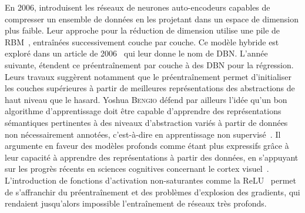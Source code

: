 En 2006, \citet{hinton_reducing_2006} introduisent les réseaux de neurones auto-encodeurs capables de compresser un ensemble de données en les projetant dans un espace de dimension plus faible. Leur approche pour la réduction de dimension utilise une pile de \gls{RBM}~\cite{ackley_learning_1985,salakhutdinov_deep_2009}, entraînées successivement couche par couche. Ce modèle hybride est exploré dans un article de 2006~\cite{hinton_fast_2006} qui leur donne le nom de \gls{DBN}. L'année suivante, \citet{bengio_greedy_2007} étendent ce préentraînement par couche à des \gls{DBN} pour la régression. Leurs travaux suggèrent notamment que le préentraînement permet d'initialiser les couches supérieures à partir de meilleures représentations des abstractions de haut niveau que le hasard. Yoshua \textsc{Bengio} défend par ailleurs l'idée qu'un bon algorithme d'apprentissage doit être capable d'apprendre des représentations sémantiques pertinentes à des niveaux d'abstraction variés à partir de données non nécessairement annotées, c'est-à-dire en apprentissage non supervisé~\cite{bengio_learning_2009}. Il argumente en faveur des modèles profonds comme étant plus expressifs grâce à leur capacité à apprendre des représentations à partir des données, en s'appuyant sur les progrès récents en sciences cognitives concernant le cortex visuel~\cite{serre_quantitative_2007}. L'introduction de fonctions d'activation non-saturantes comme la \gls{ReLU}~\cite{glorot_deep_2011} permet de s'affranchir du préentraînement et des problèmes d'explosion des gradients, qui rendaient jusqu'alors impossible l'entraînement de réseaux très profonds.

